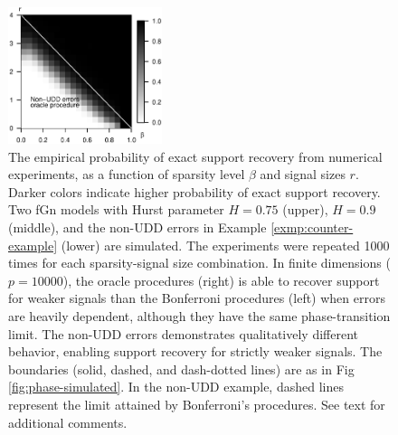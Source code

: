 \begin{figure}
    \includegraphics[width=0.4\textwidth]{./figures/simulated_phase_diagram_block_structure_p10000_oracle6.eps}
    \caption{The empirical probability of exact support recovery from numerical experiments, as a function of sparsity level $\beta$ and signal sizes $r$. Darker colors indicate higher probability of exact support recovery. 
    Two fGn models with Hurst parameter $H = 0.75$ (upper), 
    $H = 0.9$ (middle), and the non-UDD errors in Example \ref{exmp:counter-example} (lower) are simulated.
    The experiments were repeated 1000 times for each sparsity-signal size combination.
    In finite dimensions ($p=10000$), the oracle procedures (right) is able to recover support for weaker signals than the Bonferroni procedures (left) when errors are heavily dependent, although they have the same phase-transition limit.
    The non-UDD errors demonstrates qualitatively different behavior, enabling support recovery for strictly weaker signals.
    The boundaries (solid, dashed, and dash-dotted lines) are as in Fig \ref{fig:phase-simulated}.
    In the non-UDD example, dashed lines represent the limit attained by Bonferroni's procedures.
    See text for additional comments.}
    \label{fig:phase-simulated-very-dependent}
\end{figure}